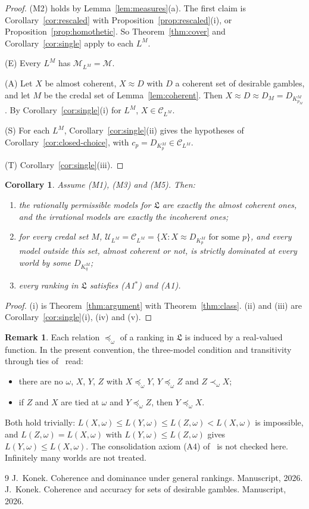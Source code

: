 \documentclass[11pt]{article}
\newtheorem{corollary}[theorem]{Corollary}
\theoremstyle{definition}
\newtheorem{remark}[theorem]{Remark}
\newcommand{\Cc}{\mathcal C}
\newcommand{\Mc}{\mathcal M}
\newcommand{\Uc}{\mathcal U}
\newcommand{\Lf}{\mathfrak L}
\begin{document}
\begin{proof}
(M2) holds by Lemma~\ref{lem:measures}(a). The first claim is Corollary~\ref{cor:rescaled} with Proposition~\ref{prop:rescaled}(i), or Proposition~\ref{prop:homothetic}. So Theorem~\ref{thm:cover} and Corollary~\ref{cor:single} apply to each $L^M$.

(E) Every $L^M$ has $\Mc_{L^M}=\Mc$.

(A) Let $X$ be almost coherent, $X\approx D$ with $D$ a coherent set of desirable gambles, and let $M$ be the credal set of Lemma~\ref{lem:coherent}. Then $X\approx D\approx D_M=D_{K^M_{p_M}}$. By Corollary~\ref{cor:single}(i) for $L^M$, $X\in\Cc_{L^M}$.

(S) For each $L^M$, Corollary~\ref{cor:single}(ii) gives the hypotheses of Corollary~\ref{cor:closed-choice}, with $c_p=D_{K^M_p}\in\Cc_{L^M}$.

(T) Corollary~\ref{cor:single}(iii).
\end{proof}

\begin{corollary}\label{cor:conclusion}
Assume (M1), (M3) and (M5). Then:
\begin{enumerate}[label=(\roman*)]
\item the rationally permissible models for $\Lf$ are exactly the almost coherent ones, and the irrational models are exactly the incoherent ones;
\item for every credal set $M$, $\Uc_{L^M}=\Cc_{L^M}=\{X:X\approx D_{K^M_p}\text{ for some }p\}$, and every model outside this set, almost coherent or not, is strictly dominated at every world by some $D_{K^M_q}$;
\item every ranking in $\Lf$ satisfies (A1$^*$) and (A1).
\end{enumerate}
\end{corollary}

\begin{proof}
(i) is Theorem~\ref{thm:argument} with Theorem~\ref{thm:class}. (ii) and (iii) are Corollary~\ref{cor:single}(i), (iv) and (v).
\end{proof}

\begin{remark}\label{rem:rest}
Each relation $\preceq_\omega$ of a ranking in $\Lf$ is induced by a real-valued function. In the present convention, the three-model condition and transitivity through ties of~\cite{App} read:
\begin{itemize}[leftmargin=3.2em]
\item[(A2)] there are no $\omega$, $X$, $Y$, $Z$ with $X\preceq_\omega Y$, $Y\preceq_\omega Z$ and $Z\prec_\omega X$;
\item[(A3)] if $Z$ and $X$ are tied at $\omega$ and $Y\preceq_\omega Z$, then $Y\preceq_\omega X$.
\end{itemize}
Both hold trivially: $L(X,\omega)\le L(Y,\omega)\le L(Z,\omega)<L(X,\omega)$ is impossible, and $L(Z,\omega)=L(X,\omega)$ with $L(Y,\omega)\le L(Z,\omega)$ gives $L(Y,\omega)\le L(X,\omega)$. The consolidation axiom (A4) of~\cite{App} is not checked here. Infinitely many worlds are not treated.
\end{remark}

\begin{thebibliography}{9}
 J.~Konek. Coherence and dominance under general rankings. Manuscript, 2026.
 J.~Konek. Coherence and accuracy for sets of desirable gambles. Manuscript, 2026.
\end{thebibliography}
\end{document}
